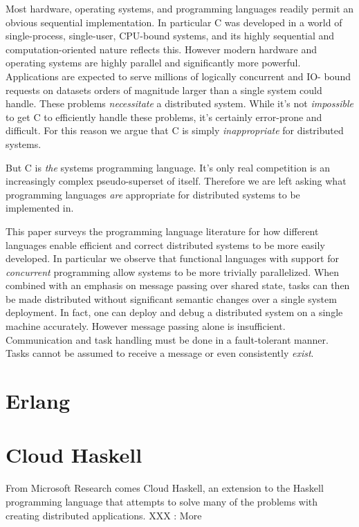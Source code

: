 \documentclass[10pt,a4paper,twocolumn]{article}
\begin{document}
Most hardware, operating systems, and programming languages readily permit an
obvious sequential implementation. In particular C was developed in a world of
single-process, single-user, CPU-bound systems, and its highly sequential and
computation-oriented nature reflects this. However modern hardware and
operating systems are highly parallel and significantly more powerful.
Applications are expected to serve millions of logically concurrent and IO-
bound requests on datasets orders of magnitude larger than a single system
could handle. These problems \emph{necessitate} a distributed system. While
it's not \emph{impossible} to get C to efficiently handle these problems, it's
certainly error-prone and difficult. For this reason we argue that C is simply
\emph{inappropriate} for distributed systems.

But C is \emph{the} systems programming language. It's only real competition is
an increasingly complex pseudo-superset of itself. Therefore we are left asking
what programming languages \emph{are} appropriate for distributed systems to be
implemented in.

This paper surveys the programming language literature for how different
languages enable efficient and correct distributed systems to be more easily
developed. In particular we observe that functional languages with support for
\emph{concurrent} programming allow systems to be more trivially parallelized.
When combined with an emphasis on message passing over shared state, tasks can
then be made distributed without significant semantic changes over a single
system deployment. In fact, one can deploy and debug a distributed system on a
single machine accurately. However message passing alone is insufficient.
Communication and task handling must be done in a fault-tolerant manner. Tasks
cannot be assumed to receive a message or even consistently \emph{exist}.

\section{Erlang}

\section{Cloud Haskell}

From Microsoft Research comes Cloud Haskell, an extension to the Haskell
programming language that attempts to solve many of the problems with creating
distributed applications. XXX : More
\end{document}
